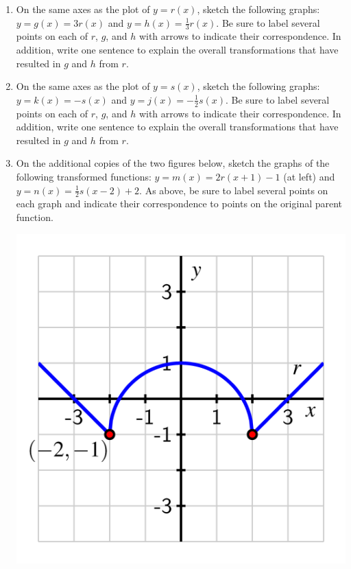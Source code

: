 \documentclass[handout, noauthor, nooutcomes]{ximera}
\begin{document}
\begin{exploration}
\begin{enumerate}[label=\alph*.]
\item
On the same axes as the plot of \(y = r(x)\), sketch the following graphs:  \(y = g(x) = 3r(x)\) and \(y = h(x) = \frac{1}{3}r(x)\).  Be sure to label several points on each of \(r\), \(g\), and \(h\) with arrows to indicate their correspondence.  In addition, write one sentence to explain the overall transformations that have resulted in \(g\) and \(h\) from \(r\).%
\item
On the same axes as the plot of \(y = s(x)\), sketch the following graphs:  \(y = k(x) = -s(x)\) and \(y = j(x) = -\frac{1}{2}s(x)\).  Be sure to label several points on each of \(r\), \(g\), and \(h\) with arrows to indicate their correspondence.  In addition, write one sentence to explain the overall transformations that have resulted in \(g\) and \(h\) from \(r\).%
\item On the additional copies of the two figures below, sketch the graphs of the following transformed functions:  \(y = m(x) = 2r(x+1)-1\) (at left) and \(y = n(x) = \frac{1}{2}s(x-2)+2\).  As above, be sure to label several points on each graph and indicate their correspondence to points on the original parent function.%
\begin{image}
\includegraphics[width=1\linewidth]{images/transformations-act-r-translation.png}


\end{image}
\end{enumerate}
\end{exploration}
\end{document}
